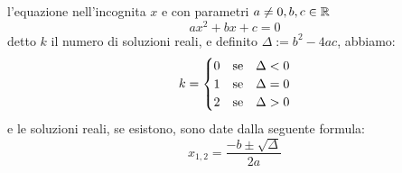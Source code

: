 \documentclass[11pt]{scrartcl}
\begin{document}
	\begin{theorem}
		\label{quadFormula}
		l'equazione nell'incognita $x$ e con parametri $a\ne0,b,c \in \mathbb R$
		$$ax^2+bx+c=0$$
		detto $k$ il numero di soluzioni reali, e definito $\Delta:=b^2-4ac$, abbiamo:
		\begin{equation}\notag
			k=
			\begin{cases}
				0 & \text{se}\quad \Delta<0 \\
				1 & \text{se}\quad \Delta=0 \\
				2 & \text{se}\quad \Delta>0
			\end{cases}
		\end{equation}
		e le soluzioni reali, se esistono, sono date dalla seguente formula:
		$$x_{1,2}=\frac{-b\pm\sqrt{\Delta}}{2a}$$
	\end{theorem}
	
	\newpage
	
\end{document}
